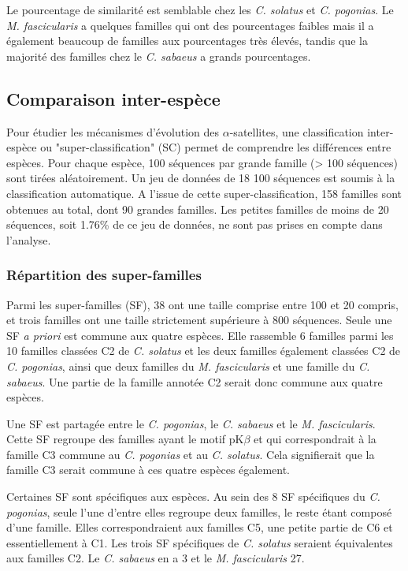 \documentclass[12pt,a4paper]{article}
\begin{document}
	Le pourcentage de similarité est semblable chez les \textit{C. solatus} et \textit{C. pogonias}. Le \textit{M. fascicularis} a  quelques familles qui ont des pourcentages faibles mais il a également beaucoup de familles aux pourcentages très élevés, tandis que la majorité des familles chez le \textit{C. sabaeus} a grands pourcentages.
	
	\subsection{Comparaison inter-espèce}
	Pour étudier les mécanismes d'évolution des $\alpha$-satellites, une classification inter-espèce ou "super-classification" (SC) permet de comprendre les différences entre espèces. Pour chaque espèce, 100 séquences par grande famille (> 100 séquences) sont tirées aléatoirement. Un jeu de données de 18 100 séquences est soumis à la classification automatique. A l'issue de cette super-classification, 158 familles sont obtenues au total, dont 90 grandes familles. Les petites familles de moins de 20 séquences, soit 1.76\% de ce jeu de données, ne sont pas prises en compte dans l'analyse.
	
	\subsubsection{Répartition des super-familles}
	Parmi les super-familles (SF), 38 ont une taille comprise entre 100 et 20 compris, et trois familles ont une taille strictement supérieure à 800 séquences. Seule une SF \textit{a priori} est commune aux quatre espèces. Elle rassemble 6 familles parmi les 10 familles classées C2 de \textit{C. solatus} et les deux familles également classées C2 de \textit{C. pogonias}, ainsi que deux familles du \textit{M. fascicularis} et une famille du \textit{C. sabaeus}. Une partie de la famille annotée C2 serait donc commune aux quatre espèces.
	
	Une SF est partagée entre le \textit{C. pogonias}, le \textit{C. sabaeus} et le \textit{M. fascicularis}. Cette SF regroupe des familles ayant le motif pK$\beta$ et qui correspondrait à la famille C3 commune au \textit{C. pogonias} et au \textit{C. solatus}. Cela signifierait que la famille C3 serait commune à ces quatre espèces également.
	
	Certaines SF sont spécifiques aux espèces. Au sein des 8 SF spécifiques du \textit{C. pogonias}, seule l'une d'entre elles regroupe deux familles, le reste étant composé d'une famille. Elles correspondraient aux familles C5, une petite partie de C6 et essentiellement à C1. Les trois SF spécifiques de \textit{C. solatus} seraient équivalentes aux familles C2. Le \textit{C. sabaeus} en a 3 et le \textit{M. fascicularis} 27.
	
\end{document}
